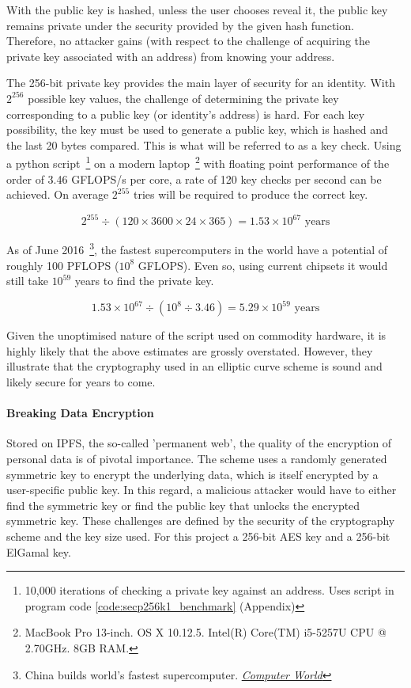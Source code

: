 With the public key is hashed, unless the user chooses reveal it, the public key remains private under the security provided by the given hash function. Therefore, no attacker gains (with respect to the challenge of acquiring the private key associated with an address) from knowing your address.

The 256-bit private key provides the main layer of security for an identity. With $2^{256}$ possible key values, the challenge of determining the private key corresponding to a public key (or identity's address) is hard. For each key possibility, the key must be used to generate a public key, which is hashed and the last 20 bytes compared. This is what will be referred to as a key check. Using a python script~\footnote{10,000 iterations of checking a private key against an address. Uses script in program code \ref{code:secp256k1_benchmark} (Appendix)} on a modern laptop~\footnote{MacBook Pro 13-inch. OS X 10.12.5. Intel(R) Core(TM) i5-5257U CPU @ 2.70GHz. 8GB RAM.} with floating point performance of the order of 3.46 GFLOPS/s per core, a rate of 120 key checks per second can be achieved. On average $2^{255}$ tries will be required to produce the correct key.

$$
2^{255} \div (120 \times 3600 \times 24 \times 365) = 1.53 \times 10^{67} \text{ years}
$$

As of June 2016~\footnote{China builds world's fastest supercomputer.  \href{http://www.computerworld.com/article/3085483/high-performance-computing/china-builds-world-s-fastest-supercomputer-without-u-s-chips.html}{\textit{Computer World}}}, the fastest supercomputers in the world have a potential of roughly 100 PFLOPS ($10^8$ GFLOPS). Even so, using current chipsets it would still take $10^{59}$ years to find the private key.

$$
1.53 \times 10^{67} \div (10^8 \div 3.46) = 5.29 \times 10^{59} \text{ years}
$$

Given the unoptimised nature of the script used on commodity hardware, it is highly likely that the above estimates are grossly overstated. However, they illustrate that the cryptography used in an elliptic curve scheme is sound and likely secure for years to come.

\paragraph{Breaking Data Encryption}

Stored on IPFS, the so-called 'permanent web', the quality of the encryption of personal data is of pivotal importance. The scheme uses a randomly generated symmetric key to encrypt the underlying data, which is itself encrypted by a user-specific public key. In this regard, a malicious attacker would have to either find the symmetric key or find the public key that unlocks the encrypted symmetric key. These challenges are defined by the security of the cryptography scheme and the key size used. For this project a 256-bit AES key and a 256-bit ElGamal key.

